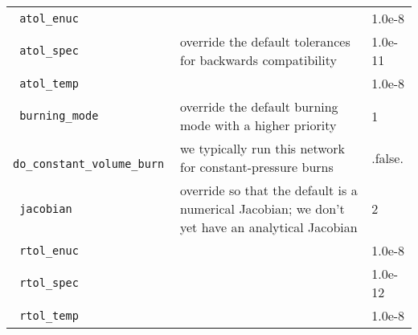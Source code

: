 \begin{landscape}
{\begin{center}
\begin{longtable}{|l|p{5.25in}|l|}
\rowcolor{tableShade}
\verb= atol_enuc = &  & 1.0e-8 \\
\verb= atol_spec = &  override the default tolerances for backwards compatibility & 1.0e-11 \\
\rowcolor{tableShade}
\verb= atol_temp = &  & 1.0e-8 \\
\verb= burning_mode = &  override the default burning mode with a higher priority & 1 \\
\rowcolor{tableShade}
\verb= do_constant_volume_burn = &  we typically run this network for constant-pressure burns & .false. \\
\verb= jacobian = &  override so that the default is a numerical Jacobian; we don't yet have an analytical Jacobian & 2 \\
\rowcolor{tableShade}
\verb= rtol_enuc = &  & 1.0e-8 \\
\verb= rtol_spec = &  & 1.0e-12 \\
\rowcolor{tableShade}
\verb= rtol_temp = &  & 1.0e-8 \\


\end{longtable}
\end{center}

} %


\end{landscape}

%


